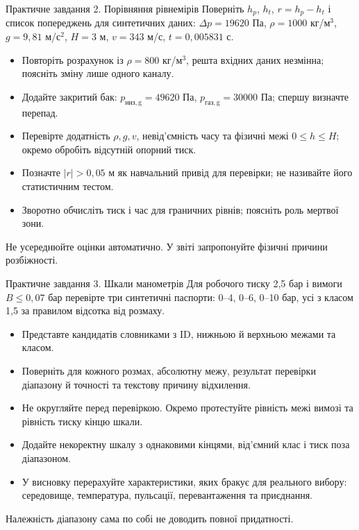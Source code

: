 \documentclass[aspectratio=169,11pt]{beamer}
\begin{document}
\begin{frame}{Практичне завдання 2. Порівняння рівнемірів}
\small
Поверніть $h_p$, $h_t$, $r=h_p-h_t$ і список попереджень для синтетичних даних: $\Delta p=19620$ Па, $\rho=1000$ кг/м$^3$, $g=9{,}81$ м/с$^2$, $H=3$ м, $v=343$ м/с, $t=0{,}005831$ с.
\begin{itemize}
\item Повторіть розрахунок із $\rho=800$ кг/м$^3$, решта вхідних даних незмінна; поясніть зміну лише одного каналу.
\item Додайте закритий бак: $p_{\mathrm{низ,g}}=49620$ Па, $p_{\mathrm{газ,g}}=30000$ Па; спершу визначте перепад.
\item Перевірте додатність $\rho,g,v$, невід'ємність часу та фізичні межі $0\le h\le H$; окремо обробіть відсутній опорний тиск.
\item Позначте $|r|>0{,}05$ м як навчальний привід для перевірки; не називайте його статистичним тестом.
\item Зворотно обчисліть тиск і час для граничних рівнів; поясніть роль мертвої зони.
\end{itemize}
Не усереднюйте оцінки автоматично. У звіті запропонуйте фізичні причини розбіжності.
\end{frame}
\begin{frame}{Практичне завдання 3. Шкали манометрів}
\small
Для робочого тиску 2,5 бар і вимоги $B\le0{,}07$ бар перевірте три синтетичні паспорти: 0--4, 0--6, 0--10 бар, усі з класом 1,5 за правилом відсотка від розмаху.
\begin{itemize}
\item Представте кандидатів словниками з ID, нижньою й верхньою межами та класом.
\item Поверніть для кожного розмах, абсолютну межу, результат перевірки діапазону й точності та текстову причину відхилення.
\item Не округляйте перед перевіркою. Окремо протестуйте рівність межі вимозі та рівність тиску кінцю шкали.
\item Додайте некоректну шкалу з однаковими кінцями, від'ємний клас і тиск поза діапазоном.
\item У висновку перерахуйте характеристики, яких бракує для реального вибору: середовище, температура, пульсації, перевантаження та приєднання.
\end{itemize}
Належність діапазону сама по собі не доводить повної придатності.
\end{frame}
\end{document}
